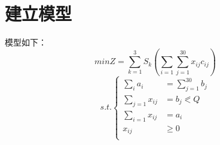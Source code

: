 \section{建立模型}
\indent 模型如下：\\
\begin{equation}
    min Z=\sum_{k = 1}^{3}S_{k}(\sum_{i = 1} \sum_{j = 1}^{30}x_{ij}c_{ij} )    
\end{equation}
\begin{equation}
    s.t.\left\{
        \begin{aligned}
        \sum_{i}a_{i} & =  \sum_{j = 1}^{30}b_{j}\\
        \sum_{j = 1}x_{ij} & =  b_{j}\eqslantless Q\\
        \sum_{i = 1}x_{ij} &  =  a_{i} \\
        x_{ij}& \geqslant  0\\
        \end{aligned}
        \right.
\end{equation}